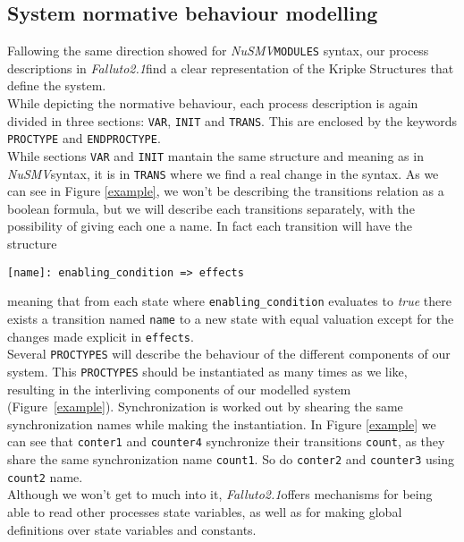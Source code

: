 \documentclass[12pt]{article}
\newcommand{\nusmv}{\mbox{\textit{NuSMV}}}
\newcommand{\falluto}{\mbox{\textit{Falluto2.1}}}
\begin{document}
\subsection{System normative behaviour modelling}
Fallowing the same direction showed for \nusmv \texttt{MODULES} syntax, our process descriptions in \falluto find a clear representation of the Kripke Structures that define the system.\\
While depicting the normative behaviour, each process description is again divided in three sections: \texttt{VAR}, \texttt{INIT} and \texttt{TRANS}. This are enclosed by the keywords \texttt{PROCTYPE} and \texttt{ENDPROCTYPE}.\\
While sections \texttt{VAR} and \texttt{INIT} mantain the same structure and meaning as in \nusmv syntax, it is in \texttt{TRANS} where we find a real change in the syntax. As we can see in Figure \ref{example}, we won't be describing the transitions relation as a boolean formula, but we will describe each transitions separately, with the possibility of giving each one a name. In fact each transition will have the structure
\begin{center}
\texttt{[name]: enabling\_condition => effects}
\end{center}
meaning that from each state where \texttt{enabling\_condition} evaluates to \textit{true} there exists a transition named \texttt{name} to a new state with equal valuation except for the changes made explicit in \texttt{effects}.\\
Several \texttt{PROCTYPES} will describe the behaviour of the different components of our system. This \texttt{PROCTYPES} should be instantiated as many times as we like, resulting in the interliving components of our modelled system (\mbox{Figure \ref{example}}).
Synchronization is worked out by shearing the same synchronization names while making the instantiation. In Figure \ref{example} we can see that \texttt{conter1} and \texttt{counter4} synchronize their transitions \texttt{count}, as they share the same synchronization name \texttt{count1}. So do \texttt{conter2} and \texttt{counter3} using \texttt{count2} name.\\
Although we won't get to much into it, \falluto offers mechanisms for being able to read other processes state variables, as well as for making global definitions over state variables and constants.
\end{document}
